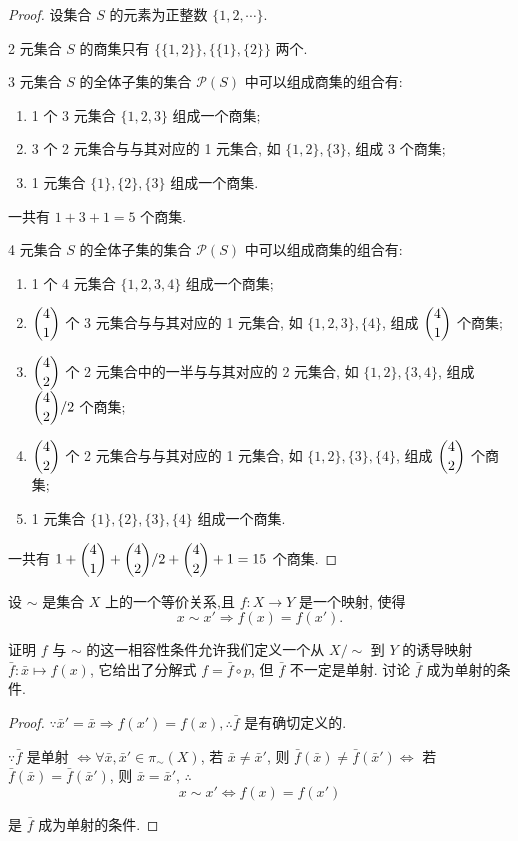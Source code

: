 \documentclass{ctexart}
\begin{document}
\begin{proof}
    设集合 $S$ 的元素为正整数 $\{1,2,\cdots\}$.

    2 元集合 $S$ 的商集只有 $\{\{1,2\}\},\{\{1\},\{2\}\}$ 两个.

    3 元集合 $S$ 的全体子集的集合 $\mathcal{P}(S)$ 中可以组成商集的组合有:
    \begin{enumerate}
        \item 1 个 3 元集合 $\{1,2,3\}$ 组成一个商集;
        \item 3 个 2 元集合与与其对应的 1 元集合, 如 $\{1,2\},\{3\}$, 组成 3 个商集;
        \item 1 元集合 $\{1\},\{2\},\{3\}$ 组成一个商集.
    \end{enumerate}

    一共有 $1+3+1=5$ 个商集.

    4 元集合 $S$ 的全体子集的集合 $\mathcal{P}(S)$ 中可以组成商集的组合有:
    \begin{enumerate}
        \item 1 个 4 元集合 $\{1,2,3,4\}$ 组成一个商集;
        \item $\dbinom{4}{1}$ 个 3 元集合与与其对应的 1 元集合, 如 $\{1,2,3\},\{4\}$, 组成 $\dbinom{4}{1}$ 个商集;
        \item $\dbinom{4}{2}$ 个 2 元集合中的一半与与其对应的 2 元集合, 如 $\{1,2\},\{3,4\}$, 组成 $\dbinom{4}{2}/2$ 个商集;
        \item $\dbinom{4}{2}$ 个 2 元集合与与其对应的 1 元集合, 如 $\{1,2\},\{3\},\{4\}$, 组成 $\dbinom{4}{2}$ 个商集;
        \item 1 元集合 $\{1\},\{2\},\{3\},\{4\}$ 组成一个商集.
    \end{enumerate}

    一共有 $1+\dbinom{4}{1}+\dbinom{4}{2}/2+\dbinom{4}{2}+1=15$ 个商集.
\end{proof}
\begin{exercise}%
    设 $\sim$ 是集合 $X$ 上的一个等价关系,且 $f:X\to Y$ 是一个映射, 使得
    \[x\sim x'\Rightarrow f(x)=f(x').\]

    证明 $f$ 与 $\sim$ 的这一相容性条件允许我们定义一个从 $X/\sim$ 到 $Y$ 的诱导映射 $\bar{f}:\bar{x}\mapsto f(x)$, 它给出了分解式 $f=\bar{f}\circ p$, 但 $\bar{f}$ 不一定是单射. 讨论 $\bar{f}$ 成为单射的条件.
\end{exercise}
\begin{proof}
    $\because\bar{x}'=\bar{x}\Rightarrow f(x')=f(x),\therefore\bar{f}$ 是有确切定义的.

    $\because\bar{f}$ 是单射 $\Leftrightarrow\forall\bar{x},\bar{x}'\in\pi_\sim(X)$, 若 $\bar{x}\neq\bar{x}'$, 则 $\bar{f}(\bar{x})\neq\bar{f}(\bar{x}')\Leftrightarrow$ 若 $\bar{f}(\bar{x})=\bar{f}(\bar{x}')$, 则 $\bar{x}=\bar{x}'$, $\therefore$
    \[x\sim x'\Leftrightarrow f(x)=f(x')\]

    是 $\bar{f}$ 成为单射的条件.
\end{proof}
\end{document}
